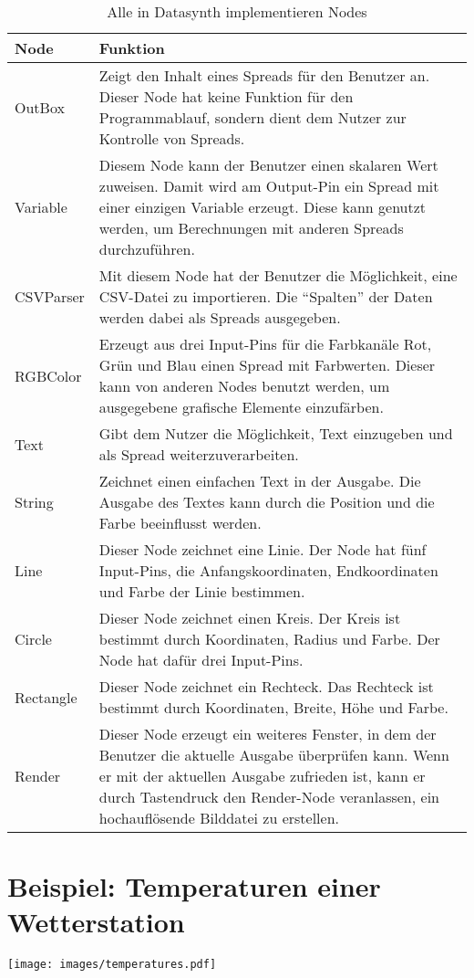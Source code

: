 \documentclass[a4paper, 
               12pt,
               DIV=calc,
               version=first,
               pdftex,
               headsepline,
               footsepline,
               bibliography=totocnumbered,
               listof=numbered]{scrreprt}
\begin{document}
\begin{table}
\centering
\begin{tabular}{|l|p{10cm}|}
\hline
\textbf{Node} & \textbf{Funktion}\\
\hline
OutBox & Zeigt den Inhalt eines Spreads für den Benutzer an. Dieser Node hat keine Funktion für den Programmablauf, sondern
dient dem Nutzer zur Kontrolle von Spreads.\\
\hline
Variable & Diesem Node kann der Benutzer einen skalaren Wert zuweisen. Damit wird am Output-Pin ein Spread mit einer einzigen
Variable erzeugt. Diese kann genutzt werden, um Berechnungen mit anderen Spreads durchzuführen.\\
\hline
CSVParser & Mit diesem Node hat der Benutzer die Möglichkeit, eine CSV-Datei zu importieren.
Die "`Spalten"' der Daten werden dabei als Spreads ausgegeben.\\
\hline
RGBColor & Erzeugt aus drei Input-Pins für die Farbkanäle Rot, Grün und Blau einen Spread mit Farbwerten. Dieser
kann von anderen Nodes benutzt werden, um ausgegebene grafische Elemente einzufärben.\\
\hline
Text & Gibt dem Nutzer die Möglichkeit, Text einzugeben und als Spread weiterzuverarbeiten.\\
\hline
String & Zeichnet einen einfachen Text in der Ausgabe. Die Ausgabe des Textes kann durch die Position und die Farbe beeinflusst werden.\\
\hline
Line & Dieser Node zeichnet eine Linie. Der Node hat fünf Input-Pins, die Anfangskoordinaten, Endkoordinaten und Farbe
der Linie bestimmen.\\
\hline
Circle & Dieser Node zeichnet einen Kreis. Der Kreis ist bestimmt durch Koordinaten, Radius und Farbe. Der Node
hat dafür drei Input-Pins.\\
\hline
Rectangle & Dieser Node zeichnet ein Rechteck. Das Rechteck ist bestimmt durch Koordinaten, Breite, Höhe und Farbe.\\
\hline
Render & Dieser Node erzeugt ein weiteres Fenster, in dem der Benutzer die aktuelle Ausgabe überprüfen kann.
Wenn er mit der aktuellen Ausgabe zufrieden ist, kann er durch Tastendruck den Render-Node veranlassen, ein
hochauflösende Bilddatei zu erstellen.\\
\hline
\end{tabular}
\caption{Alle in Datasynth implementieren Nodes}
\label{tab:alleNodes}
\end{table}


\section{Beispiel: Temperaturen einer Wetterstation}
\label{sec:temperatures}
\centering
\texttt{[image: images/temperatures.pdf]}
\end{document}
